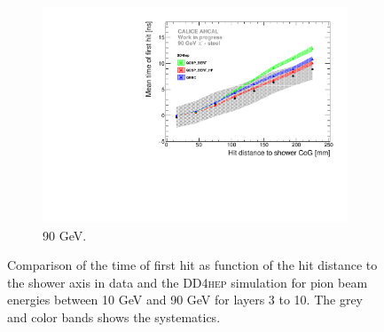 \documentclass{JINST}
\newcommand\ddhep{\textsc{DD4hep}\xspace}
\begin{document}
\begin{figure}[htbp!]
\begin{subfigure}[t]{0.49\textwidth}
    \includegraphics[width=1\textwidth]{fig/Time_Radius_90GeV_SSF_DD4hep.pdf}
    \caption{90 GeV.} \label{fig:Radius_SSF_SimData_90GeV_DD4hep}
  \end{subfigure}
  \caption{Comparison of the time of first hit as function of the hit distance to the shower axis in data and the \ddhep simulation for pion beam energies between 10 GeV and 90 GeV for layers 3 to 10. The grey and color bands shows the systematics.}
\end{figure}
\end{document}
